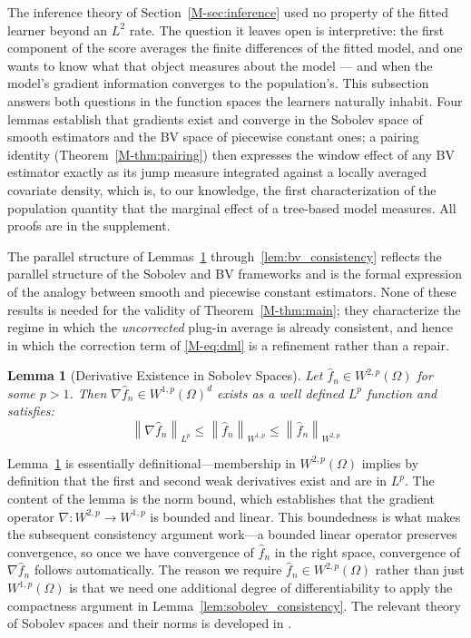 \documentclass[12pt,a4paper]{article}
\numberwithin{equation}{section}
\theoremstyle{plain}
\newtheorem{lemma}{Lemma}
\theoremstyle{definition}
\newcommand{\norm}[1]{\left\| #1 \right\|}
\newcommand{\Wonep}{W^{1,p}(\Omega)}
\newcommand{\Wtwop}{W^{2,p}(\Omega)}
\newcommand{\fn}{\hat{f}_n}
\begin{document}
	The inference theory of Section~\ref{M-sec:inference} used no property of the fitted
	learner beyond an $L^2$ rate. The question it leaves open is interpretive: the
	first component of the score averages the finite differences of the fitted model,
	and one wants to know what that object measures about the model --- and when the
	model's gradient information converges to the population's. This subsection answers
	both questions in the function spaces the learners naturally inhabit. Four lemmas
	establish that gradients exist and converge in the Sobolev space of smooth
	estimators and the BV space of piecewise constant ones; a pairing identity
	(Theorem~\ref{M-thm:pairing}) then expresses the window effect of any BV estimator
	exactly as its jump measure integrated against a locally averaged covariate
	density, which is, to our knowledge, the first characterization of the population
	quantity that the marginal effect of a tree-based model measures. All proofs are in
	the supplement.
	
	The parallel structure of Lemmas~\ref{lem:sobolev_existence}
	through~\ref{lem:bv_consistency} reflects the parallel structure of the Sobolev
	and BV frameworks and is the formal expression of the analogy between smooth and
	piecewise constant estimators. None of these results is needed for the validity of
	Theorem~\ref{M-thm:main}; they characterize the regime in which the \emph{uncorrected}
	plug-in average is already consistent, and hence in which the correction term of
	\eqref{M-eq:dml} is a refinement rather than a repair.
	
	\begin{lemma}[Derivative Existence in Sobolev Spaces]
		\label{lem:sobolev_existence}
		Let $\fn \in \Wtwop$ for some $p > 1$. Then $\nabla \fn \in W^{1,p}(\Omega)^d$
		exists as a well defined $L^p$ function and satisfies:
		\begin{equation}
			\norm{\nabla \fn}_{L^p} \leq \norm{\fn}_{W^{1,p}} \leq \norm{\fn}_{W^{2,p}}
		\end{equation}
	\end{lemma}
	
	Lemma~\ref{lem:sobolev_existence} is essentially definitional---membership in
	$\Wtwop$ implies by definition that the first and second weak derivatives exist and
	are in $L^p$. The content of the lemma is the norm bound, which establishes that
	the gradient operator $\nabla: W^{2,p} \to W^{1,p}$ is bounded and linear. This
	boundedness is what makes the subsequent consistency argument work---a bounded linear
	operator preserves convergence, so once we have convergence of $\fn$ in the right
	space, convergence of $\nabla \fn$ follows automatically. The reason we require
	$\fn \in \Wtwop$ rather than just $\Wonep$ is that we need one additional degree of
	differentiability to apply the compactness argument in
	Lemma~\ref{lem:sobolev_consistency}. The relevant theory of Sobolev spaces and their
	norms is developed in \citet[Chapter~5]{evans2010pde}.
	
\end{document}
